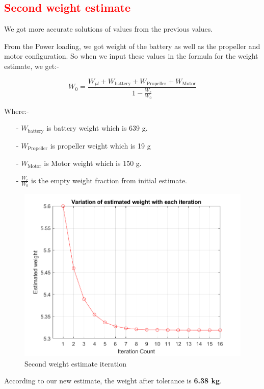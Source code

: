\documentclass[12 pt]{article}
\begin{document}
\subsection{\textcolor{red}{Second weight estimate}}

We got more accurate solutions of values from the previous values. 

From the Power loading, we got weight of the battery as well as the propeller and motor configuration. So when we input these values in the formula for the weight estimate, we get:- 

$$W_{0} = \frac{W_{pl}  +  W_{\text{battery}}+  W_{\text{Propeller}} + W_{\text{Motor}}}{1 - \frac{W_{e}}{W_{0}}}$$

Where:-
\begin{itemize}
    \item[-] $W_{\text{battery}}$ is battery weight which is 639 g.
    \item[-] $W_{\text{Propeller}}$ is propeller weight which is 19 g
    \item[-] $W_{\text{Motor}}$ is Motor weight which is 150 g.
    \item[-] $\frac{W_{e}}{W_{0}}$ is the empty weight fraction from initial estimate.
\end{itemize}

\begin{figure}[h]
    \centering
    \includegraphics[width=1.0\linewidth]{Codes//Week 2/weight_2.png}
    \caption{Second weight estimate iteration}
    \label{Second weight estimate iteration}
\end{figure}
\vspace{50cm}
 According to our new estimate, the weight after tolerance is \textbf{6.38 kg}.
\end{document}
